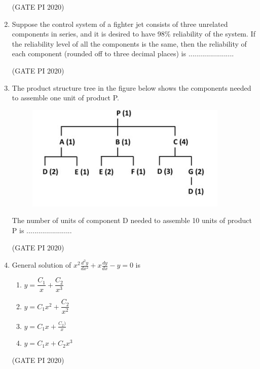 \documentclass[journal,12pt,onecolumn]{IEEEtran}
\theoremstyle{remark}
\begin{document}
\begin{enumerate}
\hfill (GATE PI 2020)

\item Suppose the control system of a fighter jet consists of three unrelated components in series, and it is desired to have 98\% reliability of the system. If the reliability level of all the components is the same, then the reliability of each component (rounded off to three decimal places) is .......................

\hfill (GATE PI 2020)

\item The product structure tree in the figure below shows the components needed to assemble one unit of product P.

\begin{figure}[h]
    \centering
    \includegraphics[width=0.5\columnwidth]{figs/fig10.png}
    \caption{}
    \label{fig:placeholder}
\end{figure}

The number of units of component D needed to assemble 10 units of product P is .......................

\hfill (GATE PI 2020)

\item General solution of $x^2 \frac{d^2 y}{dx^2} + x \frac{dy}{dx} - y = 0$ is
\begin{enumerate}
    \item $y = \dfrac{C_1} {x} + \dfrac{C_2}{x^3}$
    \item $y = C_1 x^2 + \dfrac{C_2}{x^2}$
    \item $y = C_1 x + \frac{C_2)}{x}$
    \item $y = C_1 x + C_2 x^3$
\end{enumerate}

\hfill (GATE PI 2020)


\end{enumerate}
\end{document}
